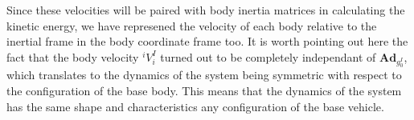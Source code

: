 \documentclass[lettersize,journal]{IEEEtran}
\def \Ad {\textbf{Ad}}
\begin{document}
Since these velocities will be paired with body inertia matrices in calculating the kinetic energy, we have represened the velocity of each body relative to the inertial frame in the body coordinate frame too. %
It is worth pointing out here the fact that the body velocity $^iV^I_i$ turned out to be completely independant of $\Ad_{g^I_0}$, which translates to the dynamics of the system being symmetric with respect to the configuration of the base body. This means that the dynamics of the system has the same shape and characteristics any configuration of the base vehicle. 

\end{document}
